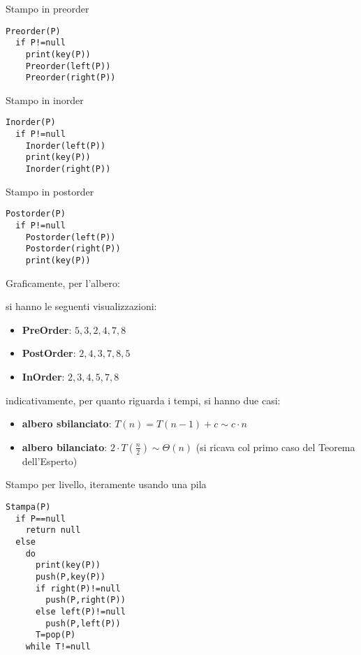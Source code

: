 \documentclass[a4paper,12pt,oneside,tikz]{book}
\begin{document}
\newpage
\begin{esempio}[preorder]
	Stampo in preorder
	\begin{verbatim}
Preorder(P)
  if P!=null 
    print(key(P))
    Preorder(left(P))
    Preorder(right(P))
\end{verbatim}
\end{esempio}
\begin{esempio}[Inorder]
	Stampo in inorder
	\begin{verbatim}
Inorder(P)
  if P!=null 
    Inorder(left(P))
    print(key(P))
    Inorder(right(P))
\end{verbatim}
\end{esempio}
\begin{esempio}[postorder]
	Stampo in postorder
	\begin{verbatim}
Postorder(P)
  if P!=null 
    Postorder(left(P))
    Postorder(right(P))
    print(key(P))
\end{verbatim}
\end{esempio}
Graficamente, per l'albero:
\begin{center}
\end{center}
si hanno le seguenti visualizzazioni:
\begin{itemize}
	\item \textbf{PreOrder}: $5,3,2,4,7,8$
	\item \textbf{PostOrder}: $2,4,3,7,8,5$
	\item \textbf{InOrder}: $2,3,4,5,7,8$
\end{itemize}
indicativamente, per quanto riguarda i tempi, si hanno due casi:
\begin{itemize}
	\item \textbf{albero sbilanciato}: $T(n)=T(n-1)+c\sim c\cdot n$
	\item \textbf{albero bilanciato}: $2\cdot T\left(\frac{n}{2}\right)\sim \Theta(n)$ (si ricava col primo caso del Teorema dell'Esperto)
\end{itemize}
\begin{esempio}
	Stampo per livello, iteramente usando una pila
	\begin{verbatim}
Stampa(P)
  if P==null
    return null
  else
    do
      print(key(P))
      push(P,key(P))
      if right(P)!=null
        push(P,right(P))
      else left(P)!=null
        push(P,left(P))
      T=pop(P)
    while T!=null
  
\end{verbatim}
\end{esempio}
\end{document}
